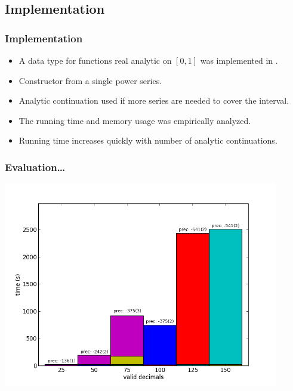 
\subsection{Implementation}
\begin{frame}
\frametitle{Implementation}
\begin{itemize}
    \item A data type for functions real analytic on $[0,1]$ was implemented in \irram .
    \item Constructor from a single power series.
    \item Analytic continuation used if more series are needed to cover the interval. 
    \item The running time and memory usage was empirically analyzed.
    \item Running time increases quickly with number of analytic continuations. 
\end{itemize}
\end{frame}
\begin{frame}
  \frametitle{Evaluation\dots}
  \includegraphics[width=0.9\textwidth]{sin_for_series_4_dep_on_n}
\end{frame}
